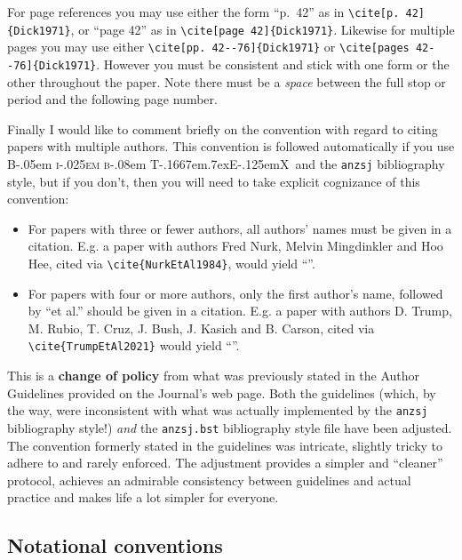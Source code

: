\documentclass[
  times,
  doublespace]{anzsauth}
\providecommand{\tightlist}{%
  \setlength{\itemsep}{0pt}\setlength{\parskip}{0pt}}\usepackage{longtable,booktabs,array}
\newcommand\BibTeX{{\rmfamily B\kern-.05em \textsc{i\kern-.025em b}\kern-.08em
T\kern-.1667em\lower.7ex\hbox{E}\kern-.125emX}}
\begin{document}
For page references you may use either the form ``p.~42'' as in
\texttt{\textbackslash{}cite{[}p.\ 42{]}\{Dick1971\}}, or ``page 42'' as
in \texttt{\textbackslash{}cite{[}page\ 42{]}\{Dick1971\}}. Likewise for
multiple pages you may use either
\texttt{\textbackslash{}cite{[}pp.\ 42-\/-76{]}\{Dick1971\}} or
\texttt{\textbackslash{}cite{[}pages\ 42-\/-76{]}\{Dick1971\}}. However
you must be consistent and stick with one form or the other throughout
the paper. Note there must be a \emph{space} between the full stop or
period and the following page number.

Finally I would like to comment briefly on the convention with regard to
citing papers with multiple authors. This convention is followed
automatically if you use \BibTeX~and the \texttt{anzsj} bibliography
style, but if you don't, then you will need to take explicit cognizance
of this convention:

\begin{itemize}
\tightlist
\item
  For papers with three or fewer authors, all authors' names must be
  given in a citation. E.g. a paper with authors Fred Nurk, Melvin
  Mingdinkler and Hoo Hee, cited via
  \texttt{\textbackslash{}cite\{NurkEtAl1984\}}, would yield
  ``\cite{NurkEtAl1984}''.
\item
  For papers with four or more authors, only the first author's name,
  followed by ``et al.'' should be given in a citation. E.g. a paper
  with authors D. Trump, M. Rubio, T. Cruz, J. Bush, J. Kasich and B.
  Carson, cited via \texttt{\textbackslash{}cite\{TrumpEtAl2021\}} would
  yield ``\cite{TrumpEtAl2021}''.
\end{itemize}

This is a \textbf{change of policy} from what was previously stated in
the Author Guidelines provided on the Journal's web page. Both the
guidelines (which, by the way, were inconsistent with what was actually
implemented by the \texttt{anzsj} bibliography style!) \emph{and} the
\texttt{anzsj.bst} bibliography style file have been adjusted. The
convention formerly stated in the guidelines was intricate, slightly
tricky to adhere to and rarely enforced. The adjustment provides a
simpler and ``cleaner'' protocol, achieves an admirable consistency
between guidelines and actual practice and makes life a lot simpler for
everyone.

\subsection{Notational conventions}\label{sec:noteConv}
\end{document}
